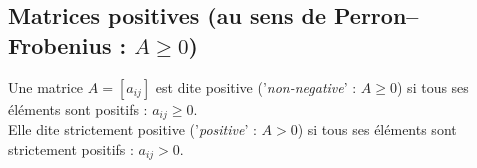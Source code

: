 % 
% 
% 

\subsection{Matrices positives (au sens de Perron–Frobenius : $A \geq 0$)} 


\begin{definition}
  Une matrice $A = [a_{ij}]$ est dite positive ('{\em non-negative}' : $A \geq 0$) si tous ses éléments sont positifs : $a_{ij} \geq 0$. \\
  Elle dite strictement positive ('{\em positive}' : $A > 0$) si tous ses éléments sont strictement positifs : $a_{ij} > 0$. 
\end{definition}

